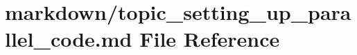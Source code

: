 \hypertarget{topic__setting__up__parallel__code_8md}{}\section{markdown/topic\+\_\+setting\+\_\+up\+\_\+parallel\+\_\+code.md File Reference}
\label{topic__setting__up__parallel__code_8md}
